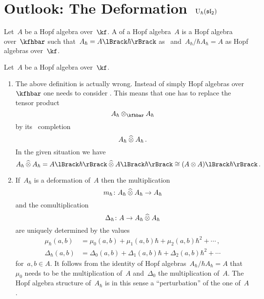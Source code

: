 \documentclass[a4paper, 11pt, oneside]{scrartcl}
\begin{document}
\section{Outlook: The Deformation~$\operatorname{U}_{\hbar}(\mathfrak{sl}_2)$}

\begin{definition}
  Let~$A$ be a Hopf algebra over~$\kf$.
  A  of a Hopf algebra~$A$ is a Hopf algebra over~$\kfhbar$ such that~$A_\hbar = \power{A}{\hbar}$ as~\modules{$\kfhbar$} and~$A_\hbar / \hbar A_\hbar = A$ as Hopf algebras over~$\kf$.
\end{definition}

\begin{remark}
  Let~$A$ be a Hopf algebra over~$\kf$.
  \begin{enumerate}
    \item
      The above definition is actually wrong.
      Instead of simply Hopf algebras over~$\kfhbar$ one needs to consider .
      This means that one has to replace the tensor product
      \[
        A_\hbar \tensor_{\kfhbar} A_\hbar
      \]
      by its~\adic{$\hbar$} completion
      \[
        A_\hbar \mathbin{\widehat{\otimes}} A_\hbar \,.
      \]
      In the given situation we have
      \[
        A_\hbar \ctensor A_\hbar
        =
        \power{A}{\hbar} \ctensor \power{A}{\hbar}
        \cong
        \power{(A \tensor A)}{\hbar} \,.
      \]
    \item
      If~$A_{\hbar}$ is a deformation of~$A$ then the multiplication
      \[
        m_{\hbar}
        \colon
        A_\hbar \mathbin{\widehat{\otimes}} A_\hbar
        \to
        A_\hbar
      \]
      and the comultiplication
      \[
        \Delta_{\hbar}
        \colon
        A
        \to
        A_\hbar \mathbin{\widehat{\otimes}} A_\hbar
      \]
      are uniquely determined by the values
      \begin{align*}
        \mu_{\hbar}(a,b)
        &=
        \mu_0(a,b) + \mu_1(a,b) \hbar + \mu_2(a,b) \hbar^2 + \dotsb \,,
        \\
        \Delta_{\hbar}(a,b)
        &=
        \Delta_0(a,b) + \Delta_1(a,b) \hbar + \Delta_2(a,b) \hbar^2 + \dotsb
      \end{align*}
      for~$a, b \in A$.
      It follows from the identity of Hopf algebras~$A_\hbar / \hbar A_\hbar = A$ that~$\mu_0$ needs to be the multiplication of~$A$ and~$\Delta_0$ the multiplication of~$A$.
      The Hopf algebra structure of~$A_\hbar$ is in this sense a \enquote{perturbation} of the one of~$A$.
  \end{enumerate}
\end{remark}
\end{document}
